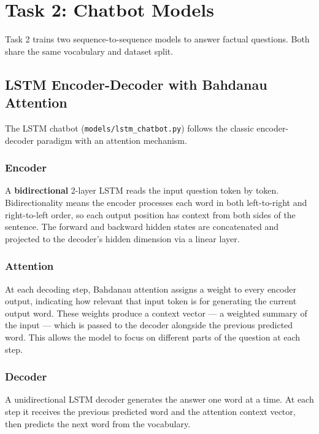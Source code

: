 \section{Task 2: Chatbot Models}
\label{sec:task2}

Task 2 trains two sequence-to-sequence models to answer factual questions. Both
share the same vocabulary and dataset split.

\subsection{LSTM Encoder-Decoder with Bahdanau Attention}

The LSTM chatbot (\texttt{models/lstm\_chatbot.py}) follows the classic
encoder-decoder paradigm with an attention mechanism.

\subsubsection*{Encoder}

A \textbf{bidirectional} 2-layer LSTM reads the input question token by token.
Bidirectionality means the encoder processes each word in both left-to-right and
right-to-left order, so each output position has context from both sides of the
sentence. The forward and backward hidden states are concatenated and projected
to the decoder's hidden dimension via a linear layer.

\subsubsection*{Attention}

At each decoding step, Bahdanau attention assigns a weight to every encoder
output, indicating how relevant that input token is for generating the current
output word. These weights produce a context vector — a weighted summary of the
input — which is passed to the decoder alongside the previous predicted word.
This allows the model to focus on different parts of the question at each step.

\subsubsection*{Decoder}

A unidirectional LSTM decoder generates the answer one word at a time. At each
step it receives the previous predicted word and the attention context vector,
then predicts the next word from the vocabulary.

